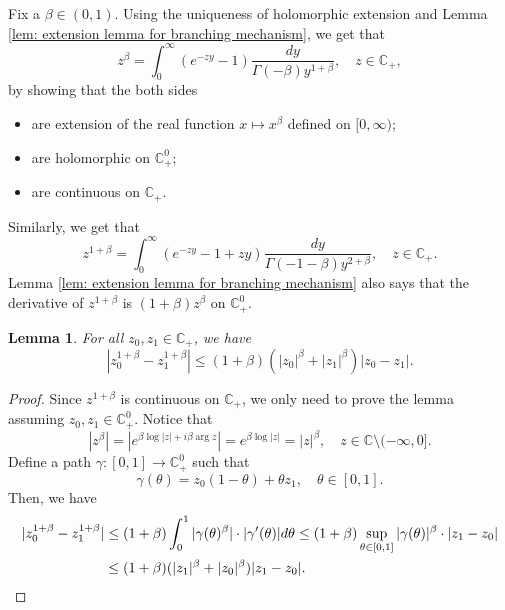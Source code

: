 \documentclass[12pt,a4paper]{amsart}
\theoremstyle{plain}
\newtheorem{lem}[thm]{Lemma}
\theoremstyle{definition}
\numberwithin{equation}{section}
\begin{document}
    Fix a $\beta \in (0,1)$.
    Using the uniqueness of holomorphic extension and Lemma \ref{lem: extension lemma for branching mechanism}, we get that
\begin{equation}
    z^{\beta}
	= \int_0^\infty (e^{-zy}-1) \frac{dy}{\Gamma(-\beta)y^{1+\beta}},
    \quad z\in \mathbb C_+,
\end{equation}
	by showing that the both sides
\begin{itemize}
\item
    are extension of the real function $x\mapsto x^{\beta}$ defined on $[0,\infty)$;
\item
    are holomorphic on $\mathbb C_+^0$;
\item
    are continuous on $\mathbb C_+$.
\end{itemize}
    Similarly, we get that
\begin{equation}
\label{eq: stable branching on C+}
    z^{1+\beta}
    = \int_0^\infty (e^{-zy}-1+zy)\frac{dy}{\Gamma(-1-\beta)y^{2+\beta}},
    \quad z\in \mathbb C_+.
\end{equation}
    Lemma \ref{lem: extension lemma for branching mechanism} also says that the derivative of $z^{1+\beta}$ is $(1+\beta)z^{\beta}$ on $\mathbb C^0_+$.
\begin{lem}
\label{lem: Lip of power function}
    For all $z_0,z_1 \in \mathbb C_+$, we have
\begin{equation}
\label{eq: Lip of power function}
    |z_0^{1+\beta} - z_1^{1+\beta}|
    \leq (1+\beta)(|z_0|^{\beta}+|z_1|^{\beta})|z_0 - z_1|.
\end{equation}

\end{lem}
\begin{proof}
    Since $z^{1+\beta}$ is continuous on $\mathbb C_+$, we only need to prove the lemma assuming $z_0,z_1 \in \mathbb C^0_+$.
    Notice that
\begin{equation}
\label{eq: upper bound for beta power of z}
	|z^\beta|
	= |e^{\beta \log |z| +i\beta \operatorname {arg}z}| = e^{\beta \log |z|} = |z|^\beta,
	\quad z \in \mathbb C\setminus (-\infty, 0].
\end{equation}
    Define a path $\gamma: [0,1] \to \mathbb C^0_+$ such that
\[
    \gamma(\theta)
    = z_0 (1-\theta) + \theta z_1,
    \quad \theta \in [0,1].
\]
    Then, we have
\begin{align}
    |z_0^{1+\beta} - z_1^{1+\beta}|
    &\leq (1+\beta) \int_0^1 |\gamma(\theta)^{\beta}|\cdot |\gamma'(\theta)|d\theta
    \leq (1+\beta)  \sup_{\theta \in [0,1]} |\gamma(\theta)|^{\beta} \cdot |z_1-z_0|
    \\&\leq (1+\beta)  ( |z_1|^{\beta}+|z_0|^{\beta} ) |z_1-z_0|.
    \qedhere
\end{align}
\end{proof}
\end{document}

